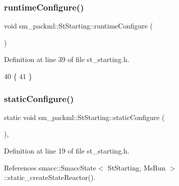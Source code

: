 \subsubsection{\texorpdfstring{runtime\+Configure()}{runtimeConfigure()}}
{\footnotesize\ttfamily void sm\+\_\+packml\+::\+St\+Starting\+::runtime\+Configure (\begin{DoxyParamCaption}{ }\end{DoxyParamCaption})\hspace{0.3cm}{\ttfamily [inline]}}



Definition at line 39 of file st\+\_\+starting.\+h.


\begin{DoxyCode}
40     \{
41     \}
\end{DoxyCode}
\mbox{\label{structsm__packml_1_1StStarting_a41a4418153e0a3756f8f5f93d13aa16d}} 
\subsubsection{\texorpdfstring{static\+Configure()}{staticConfigure()}}
{\footnotesize\ttfamily static void sm\+\_\+packml\+::\+St\+Starting\+::static\+Configure (\begin{DoxyParamCaption}{ }\end{DoxyParamCaption})\hspace{0.3cm}{\ttfamily [inline]}, {\ttfamily [static]}}



Definition at line 19 of file st\+\_\+starting.\+h.



References smacc\+::\+Smacc\+State$<$ St\+Starting, Ms\+Run $>$\+::static\+\_\+create\+State\+Reactor().


